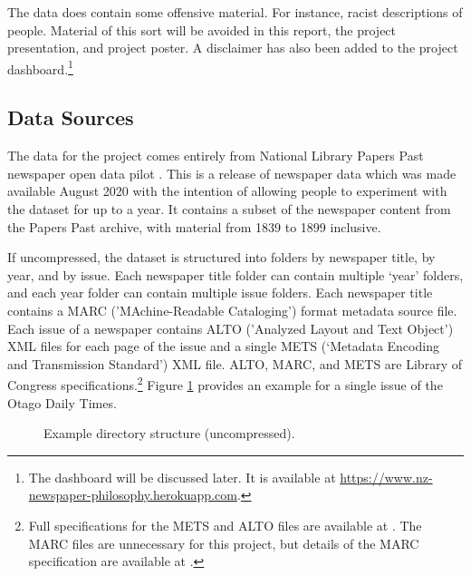 \documentclass{article}
\begin{document}
The data does contain some offensive material. For instance, racist descriptions of people. Material of this sort will be avoided in this report, the project presentation, and project poster. A disclaimer has also been added to the project dashboard.\footnote{The dashboard will be discussed later. It is available at
\url{https://www.nz-newspaper-philosophy.herokuapp.com}.}

\subsection{Data Sources}

The data for the project comes entirely from National Library Papers Past newspaper open data pilot \cite{ppnodp}. This is a release of newspaper data which was made available August 2020 with the intention of allowing people to experiment with the dataset for up to a year. It contains a subset of the newspaper content from the Papers Past archive, with material from 1839 to 1899 inclusive.

If uncompressed, the dataset is structured into folders by newspaper title, by year, and by issue. Each newspaper title folder can contain multiple `year' folders, and each year folder can contain multiple issue folders. Each newspaper title contains a MARC ('MAchine-Readable Cataloging') format metadata source file. Each issue of a newspaper contains ALTO ('Analyzed Layout and Text Object') XML files for each page of the issue and a single METS (‘Metadata Encoding and Transmission Standard’) XML file. ALTO, MARC, and METS are Library of Congress specifications.\footnote{Full specifications for the METS and ALTO files are available at \cite{mets-alto}. The MARC files are unnecessary for this project, but details of the MARC specification are available at \cite{marc}.} Figure \ref{f:dirtree} provides an example for a single issue of the Otago Daily Times.

    \begin{figure}
    \centering
    \caption{Example directory structure (uncompressed).}
    \label{f:dirtree}
    \end{figure}
\end{document}

